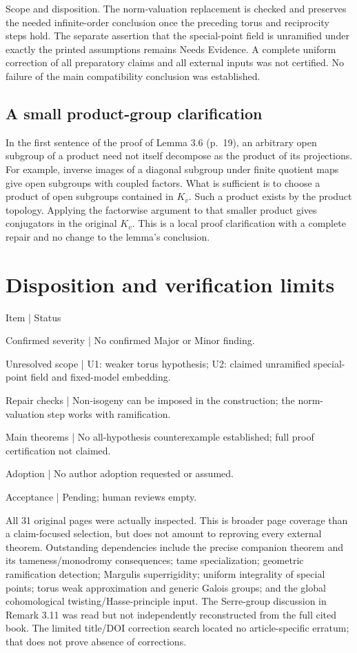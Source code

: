\documentclass[10pt]{article}
\begin{document}
Scope and disposition. The norm-valuation replacement is checked and preserves the needed infinite-order conclusion once the preceding torus and reciprocity steps hold. The separate assertion that the special-point field is unramified under exactly the printed assumptions remains Needs Evidence. A complete uniform correction of all preparatory claims and all external inputs was not certified. No failure of the main compatibility conclusion was established.\par
\subsection*{A small product-group clarification}
In the first sentence of the proof of Lemma 3.6 (p. 19), an arbitrary open subgroup of a product need not itself decompose as the product of its projections. For example, inverse images of a diagonal subgroup under finite quotient maps give open subgroups with coupled factors. What is sufficient is to choose a product of open subgroups contained in \(K_v\). Such a product exists by the product topology. Applying the factorwise argument to that smaller product gives conjugators in the original \(K_v\). This is a local proof clarification with a complete repair and no change to the lemma’s conclusion.\par
\section*{Disposition and verification limits}
Item | Status\par
Confirmed severity | No confirmed Major or Minor finding.\par
Unresolved scope | U1: weaker torus hypothesis; U2: claimed unramified special-point field and fixed-model embedding.\par
Repair checks | Non-isogeny can be imposed in the construction; the norm-valuation step works with ramification.\par
Main theorems | No all-hypothesis counterexample established; full proof certification not claimed.\par
Adoption | No author adoption requested or assumed.\par
Acceptance | Pending; human reviews empty.\par
All 31 original pages were actually inspected. This is broader page coverage than a claim-focused selection, but does not amount to reproving every external theorem. Outstanding dependencies include the precise companion theorem and its tameness/monodromy consequences; tame specialization; geometric ramification detection; Margulis superrigidity; uniform integrality of special points; torus weak approximation and generic Galois groups; and the global cohomological twisting/Hasse-principle input. The Serre-group discussion in Remark 3.11 was read but not independently reconstructed from the full cited book. The limited title/DOI correction search located no article-specific erratum; that does not prove absence of corrections.\par
\end{document}
